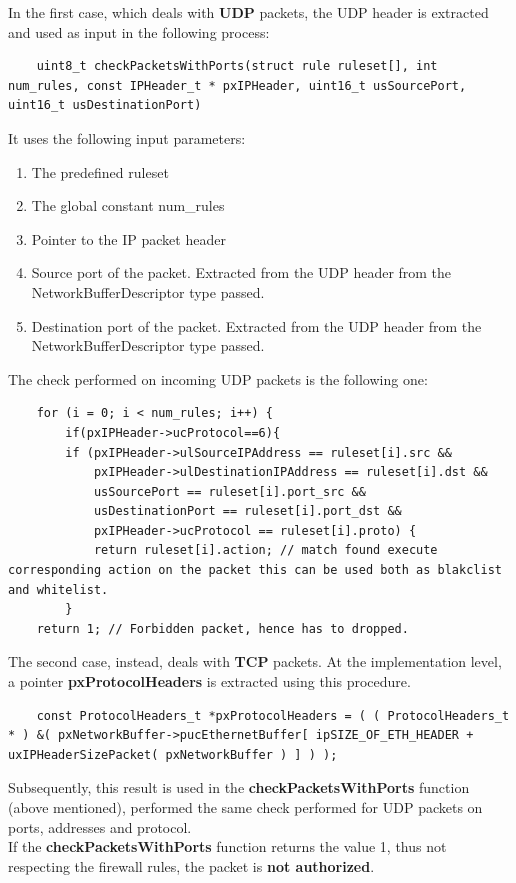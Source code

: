 \documentclass{exam}
\begin{document}
In the first case, which deals with \textbf{UDP} packets, the UDP header is extracted and used as input in the following process:
\begin{lstlisting}
    uint8_t checkPacketsWithPorts(struct rule ruleset[], int num_rules, const IPHeader_t * pxIPHeader, uint16_t usSourcePort, uint16_t usDestinationPort)
\end{lstlisting}
It uses the following input parameters:
\begin{enumerate}
\item The predefined ruleset
\item The global constant num\_rules
\item Pointer to the IP packet header
\item Source port of the packet. Extracted from the UDP header from the NetworkBufferDescriptor type passed.
\item Destination port of the packet. Extracted from the UDP header from the NetworkBufferDescriptor type passed.
\end{enumerate}
The check performed on incoming UDP packets is the following one:
\begin{lstlisting}
    for (i = 0; i < num_rules; i++) {
        if(pxIPHeader->ucProtocol==6){
        if (pxIPHeader->ulSourceIPAddress == ruleset[i].src &&
            pxIPHeader->ulDestinationIPAddress == ruleset[i].dst &&
            usSourcePort == ruleset[i].port_src &&
            usDestinationPort == ruleset[i].port_dst &&
            pxIPHeader->ucProtocol == ruleset[i].proto) {
            return ruleset[i].action; // match found execute corresponding action on the packet this can be used both as blakclist and whitelist.
        }
    return 1; // Forbidden packet, hence has to dropped.
\end{lstlisting}
The second case, instead, deals with \textbf{TCP} packets. At the implementation level, a pointer \textbf{pxProtocolHeaders} is extracted using this procedure.
\begin{lstlisting}
    const ProtocolHeaders_t *pxProtocolHeaders = ( ( ProtocolHeaders_t * ) &( pxNetworkBuffer->pucEthernetBuffer[ ipSIZE_OF_ETH_HEADER + uxIPHeaderSizePacket( pxNetworkBuffer ) ] ) );
\end{lstlisting}
Subsequently, this result is used in the \textbf{checkPacketsWithPorts} function (above mentioned), performed the same check performed for UDP packets on ports, addresses and protocol.
\\If the \textbf{checkPacketsWithPorts} function returns the value 1, thus not respecting the firewall rules, the packet is \textbf{not authorized}.\\
\end{document}
